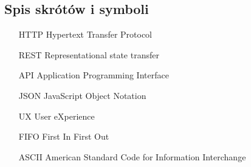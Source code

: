 \documentclass[a4paper,twoside,12pt]{book}
\begin{document}
\begin{appendices}


   \chapter*{Spis skrótów i symboli}

   \begin{itemize}
      \item[HTTP] Hypertext Transfer Protocol
      \item[REST] Representational state transfer
      \item[API] Application Programming Interface
      \item[JSON] JavaScript Object Notation
      \item[UX] User eXperience
      \item[FIFO] First In First Out
      \item[ASCII] American Standard Code for Information Interchange
   \end{itemize}







\end{appendices}
\end{document}
